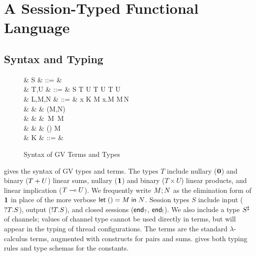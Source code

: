\documentclass[oribibl,orivec,envcountsame]{llncs}
\begin{document}
\section{A Session-Typed Functional Language}\label{sec:gv}

\subsection{Syntax and Typing}\label{sec:gv-static}

\begin{figure}[float]
\begin{syntax}
   & S & ::= &  \mid {} \mid \interm \mid \outterm \mid {} \\
   & T,U & ::= & S \mid \one \mid T \gvtimes U \mid \zero \mid T \gvplus U \mid T \lto U
  \\ %
   & L,M,N & ::= & x \mid K \app M \mid \lambda x.M \mid M\,N \\
  & & \mid & (M,N) \mid {} \\
  & & \mid & \,M \mid {}\,M \mid {} \\
  & & \mid & () \mid {} \mid {} \app M \\
   & K & ::= &  \mid {} \mid {} \mid {} \mid {}\\
\end{syntax}
\caption{Syntax of GV Terms and Types}\label{fig:gv-syntax}
\end{figure}

 gives the syntax of GV types and terms. The types $T$ include nullary ($\mathbf{0}$)
and binary ($T + U$) linear sums, nullary ($\mathbf{1}$) and binary ($T \times U$) linear products,
and linear implication ($T \multimap U$). We frequently write $M; N$ as the elimination form
of $\mathbf{1}$ in place of the more verbose $\mathsf{let}\;() = M\;\mathsf{in}\;N$. Session types $S$ include input (${?T.S}$), output (${!T.S}$), and closed sessions ($\mathsf{end}_?$, $\mathsf{end}_!$). We also include a type
$S^\sharp$ of channels; values of channel type cannot be used directly in terms, but will appear
in the typing of thread configurations. The terms are the standard $\lambda$-calculus terms,
augmented with constructs for pairs and sums.  gives both typing rules and type
schemas for the constants.
\end{document}
